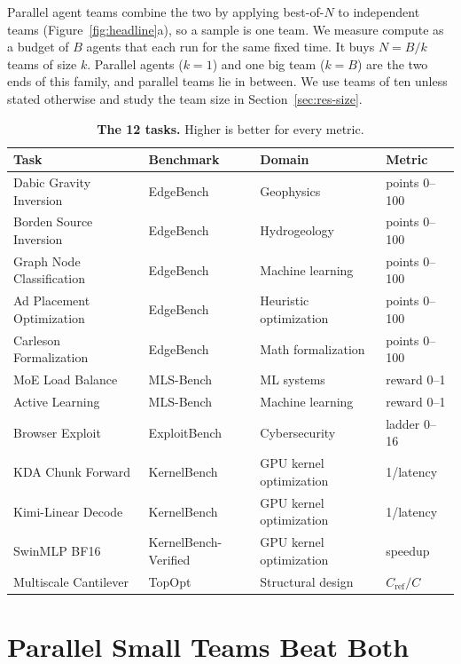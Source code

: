 \documentclass[numbers,10pt]{arxiv}
\renewcommand{\paragraph}[1]{\sansbf{#1}}
\begin{document}
\paragraph{Parallel agent teams.} Parallel agent teams combine the two by applying best-of-$N$ to independent teams (Figure~\ref{fig:headline}a), so a sample is one team. We measure compute as a budget of $B$ agents that each run for the same fixed time. It buys $N=B/k$ teams of size $k$. Parallel agents ($k=1$) and one big team ($k=B$) are the two ends of this family, and parallel teams lie in between. We use teams of ten unless stated otherwise and study the team size in Section~\ref{sec:res-size}.

\begin{table}[t]
\caption{\textbf{The 12 tasks.} Higher is better for every metric.}
\label{tab:tasks}
\centering\footnotesize
\setlength{\tabcolsep}{4pt}
\begin{tabular}{llll}
\toprule
Task & Benchmark & Domain & Metric \\
\midrule
Dabic Gravity Inversion & EdgeBench & Geophysics & points 0--100 \\
Borden Source Inversion & EdgeBench & Hydrogeology & points 0--100 \\
Graph Node Classification & EdgeBench & Machine learning & points 0--100 \\
Ad Placement Optimization & EdgeBench & Heuristic optimization & points 0--100 \\
Carleson Formalization & EdgeBench & Math formalization & points 0--100 \\
MoE Load Balance & MLS-Bench & ML systems & reward 0--1 \\
Active Learning & MLS-Bench & Machine learning & reward 0--1 \\
Browser Exploit & ExploitBench & Cybersecurity & ladder 0--16 \\
KDA Chunk Forward & KernelBench & GPU kernel optimization & 1/latency \\
Kimi-Linear Decode & KernelBench & GPU kernel optimization & 1/latency \\
SwinMLP BF16 & KernelBench-Verified & GPU kernel optimization & speedup \\
Multiscale Cantilever & TopOpt & Structural design & $C_{\mathrm{ref}}/C$ \\
\bottomrule
\end{tabular}
\end{table}

\section{Parallel Small Teams Beat Both}
\label{sec:results}
\end{document}
